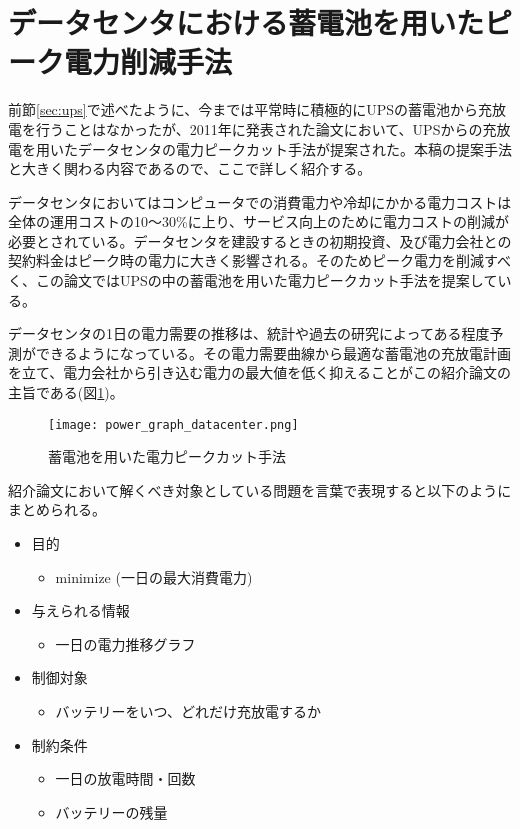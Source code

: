 \section{データセンタにおける蓄電池を用いたピーク電力削減手法}
\label{sec:capping}

前節\ref{sec:ups}で述べたように、今までは平常時に積極的にUPSの蓄電池から充放電を行うことはなかったが、2011年に発表された論文\cite{Govindan:2011:BLT:2024723.2000105}において、UPSからの充放電を用いたデータセンタの電力ピークカット手法が提案された。本稿の提案手法と大きく関わる内容であるので、ここで詳しく紹介する。

データセンタにおいてはコンピュータでの消費電力や冷却にかかる電力コストは全体の運用コストの10〜30\%に上り、サービス向上のために電力コストの削減が必要とされている。データセンタを建設するときの初期投資、及び電力会社との契約料金はピーク時の電力に大きく影響される。そのためピーク電力を削減すべく、この論文ではUPSの中の蓄電池を用いた電力ピークカット手法を提案している。

データセンタの1日の電力需要の推移は、統計や過去の研究によってある程度予測ができるようになっている。その電力需要曲線から最適な蓄電池の充放電計画を立て、電力会社から引き込む電力の最大値を低く抑えることがこの紹介論文の主旨である(図\ref{fig:power_graph_datacenter})。
\begin{figure}[t]
 \begin{center}
  \texttt{[image: power\_graph\_datacenter.png]}
 \end{center}
 \caption{蓄電池を用いた電力ピークカット手法}
 \label{fig:power_graph_datacenter}
\end{figure}

紹介論文において解くべき対象としている問題を言葉で表現すると以下のようにまとめられる。

\begin{itemize}
  \item 目的
    \begin{itemize}
      \item minimize (一日の最大消費電力)
    \end{itemize}
  \item 与えられる情報
    \begin{itemize}
      \item 一日の電力推移グラフ
    \end{itemize}
  \item 制御対象
    \begin{itemize}
      \item バッテリーをいつ、どれだけ充放電するか
    \end{itemize}
  \item 制約条件
    \begin{itemize}
      \item 一日の放電時間・回数
      \item バッテリーの残量
    \end{itemize}
\end{itemize}

